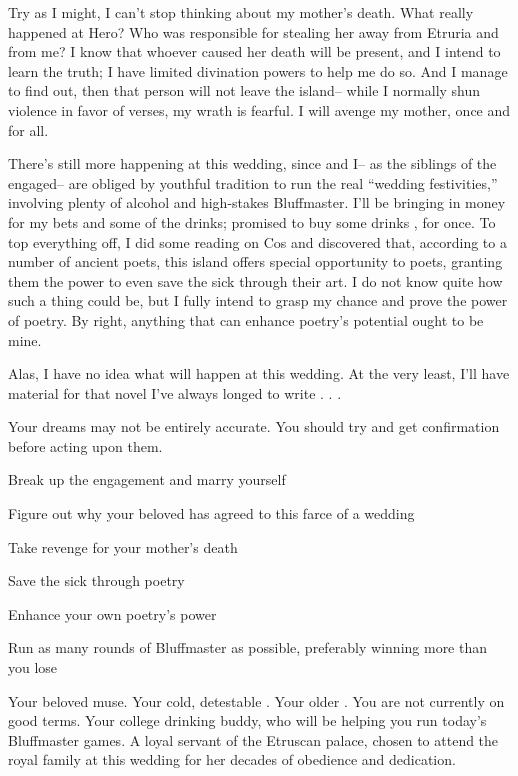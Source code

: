 \documentclass[char]{Kos}
\begin{document}
Try as I might, I can't stop thinking about my mother's death. What really happened at Hero? Who was responsible for stealing her away from Etruria and from me? I know that whoever caused her death will be present, and I intend to learn the truth; I have limited divination powers to help me do so. And I manage to find out, then that person will not leave the island-- while I normally shun violence in favor of verses, my wrath is fearful. I will avenge my mother, once and for all.

There's still more happening at this wedding, since \cWard{} and I-- as the siblings of the engaged-- are obliged by youthful tradition to run the real ``wedding festivities,'' involving plenty of alcohol and high-stakes Bluffmaster. I'll be bringing in money for my bets and some of the drinks; \cWard{} promised to buy some drinks \cWard{\themself}, for once. To top everything off, I did some reading on Cos and discovered that, according to a number of ancient poets, this island offers special opportunity to poets, granting them the power to even save the sick through their art. I do not know quite how such a thing could be, but I fully intend to grasp my chance and prove the power of poetry. By right, anything that can enhance poetry's potential ought to be mine.

Alas, I have no idea what will happen at this wedding. At the very least, I'll have material for that novel I've always longed to write . . . 

\begin{itemz}[Notes]
  \item Your dreams may not be entirely accurate. You should try and get confirmation before acting upon them.
\end{itemz}

\begin{itemz}[Goals]
\item Break up the engagement and marry \cBride{} yourself
\item Figure out why your beloved \cBride{} has agreed to this farce of a wedding
\item Take revenge for your mother's death
\item Save the sick through poetry
\item Enhance your own poetry's power
\item Run as many rounds of Bluffmaster as possible, preferably winning more than you lose
\end{itemz}


\begin{contacts}
\contact{\cBride{}} Your beloved muse.
\contact{\cEtruriaKing{}} Your cold, detestable \cEtruriaKing{\parent}.
\contact{\cGroom{}} Your older \cGroom{\sibling}. You are not currently on good terms.
\contact{\cWard{}} Your college drinking buddy, who will be helping you run today's Bluffmaster games.
\contact{\cAssassin{}} A loyal servant of the Etruscan palace, chosen to attend the royal family at this wedding for her decades of obedience and dedication.
\end{contacts} 
\end{document}
